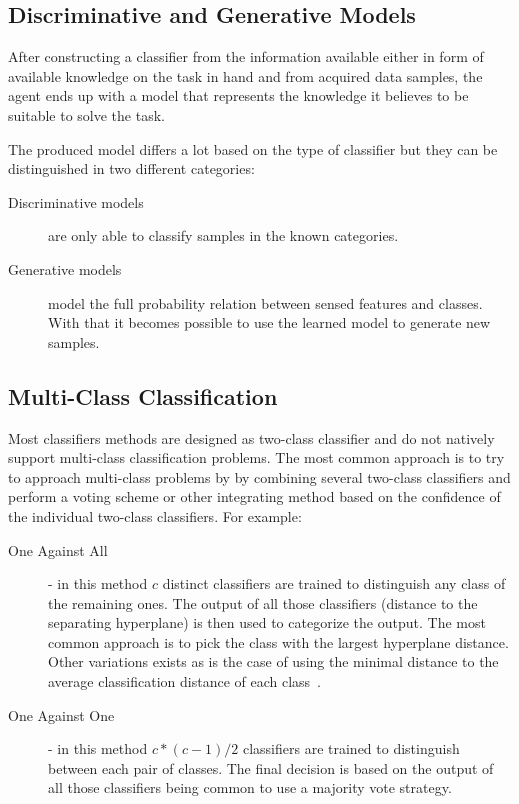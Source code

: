 \subsection{Discriminative and Generative Models}
\label{sec:discriminative-vs-generative}
After constructing a classifier from the information available either in form of
available knowledge on the task in hand and from acquired data samples, the agent
ends up with a model that represents the knowledge it believes to be suitable to
solve the task.

The produced model differs a lot based on the type of classifier but they can be
distinguished in two different categories:
\begin{description}
\item[Discriminative models] are only able to classify samples in the known categories.
\item[Generative models] model the full probability relation between sensed
features and classes. With that it becomes possible to use the learned model to generate
new samples.
\end{description}


\subsection{Multi-Class Classification}
\label{sec:multiclass-classifiers}
Most classifiers methods are designed as two-class classifier and do not
natively support multi-class classification problems.
The most common approach is to try to approach multi-class problems by
by combining several two-class classifiers and perform a voting scheme or other
integrating method based on the confidence of the individual two-class classifiers.
For example:

\begin{description}
\item[One Against All] - in this method $c$ distinct classifiers are trained to
distinguish any class of the remaining ones. The output of all those classifiers
(distance to the separating hyperplane) is then used to categorize the output.
The most common approach is to pick the class with the largest hyperplane
distance. Other variations exists as is the case of using the minimal distance
to the average classification distance of each class~\citep{pronobis2007iros}.

\item[One Against One] - in this method $c*(c-1)/2$ classifiers are trained to
distinguish between each pair of classes. The final decision is based on the
output of all those classifiers being common to use a majority vote strategy.
\end{description}


